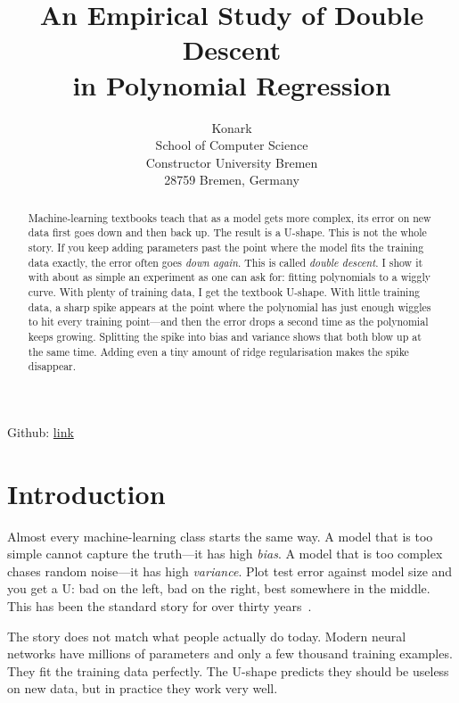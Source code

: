 \documentclass[11pt]{article}
\title{An Empirical Study of Double Descent\\ in Polynomial Regression}
\author{%
  \name Konark \email{} \\
  \addr School of Computer Science\\
        Constructor University Bremen\\
        28759 Bremen, Germany
}
\begin{document}
\maketitle
\thispagestyle{plain}

\noindent Github: \href{https://github.com/konark2006/Academic-Skills-in-CS-Konark-Konark-30008219-}{link}
\par\vspace{6pt}

\begin{abstract}
Machine-learning textbooks teach that as a model gets more complex,
its error on new data first goes down and then back up. The result
is a U-shape. This is not the whole story. If you keep adding
parameters past the point where the model fits the training data
exactly, the error often goes \emph{down again}. This is called
\emph{double descent}. I show it with about as simple an experiment
as one can ask for: fitting polynomials to a wiggly curve. With
plenty of training data, I get the textbook U-shape. With little
training data, a sharp spike appears at the point where the
polynomial has just enough wiggles to hit every training point---and
then the error drops a second time as the polynomial keeps growing.
Splitting the spike into bias and variance shows that both blow up
at the same time. Adding even a tiny amount of ridge regularisation
makes the spike disappear.
\end{abstract}

\section{Introduction}
\label{sec:intro}

Almost every machine-learning class starts the same way. A model
that is too simple cannot capture the truth---it has high
\emph{bias}. A model that is too complex chases random noise---it
has high \emph{variance}. Plot test error against model size and
you get a U: bad on the left, bad on the right, best somewhere in
the middle. This has been the standard story for over thirty
years~\citep{geman1992neural,hastie2009elements}.

The story does not match what people actually do today. Modern
neural networks have millions of parameters and only a few thousand
training examples. They fit the training data perfectly. The
U-shape predicts they should be useless on new data, but in practice
they work very well.
\end{document}
